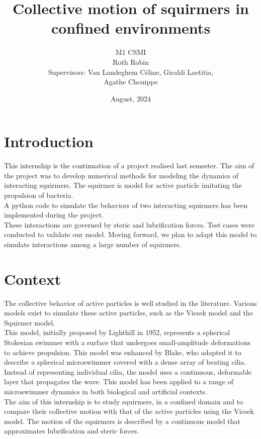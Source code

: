 \documentclass{article}
\begin{document}
\title{Collective motion of squirmers in confined environments\vspace{2cm}}
\author{
M1 CSMI\\
\vspace{3cm}
Roth Robin\\
Supervisors: Van Landeghem Céline, Giraldi Laetitia,\\ Agathe Chouippe
\vspace{2cm}}
\date{August, 2024}
\maketitle

\newpage
\tableofcontents
\newpage
\section{Introduction}
This internship is the continuation of a project realised last semester. The aim of the project was
to develop numerical methods for modeling the dynamics of interacting squirmers. The squirmer is model for active particle imitating the propulsion of bacteria.\\
A python code to simulate the behaviors of two interacting squirmers has been implemented during the project.\\
These interactions are governed by steric and lubrification forces.
Test cases were conducted to validate our model. Moving forward, we plan to adapt this model to 
simulate interactions among a large number of squirmers.
\section{Context}
The collective behavior of active particles is well studied in the literature. 
Various models exist to simulate these active particles, such as the Vicsek model\cite{Vicsek} and the Squirmer model. \\
This model, initially proposed by Lighthill in 1952\cite{Wikipedia}, represents a spherical Stokesian swimmer with a surface that undergoes 
small-amplitude deformations to achieve propulsion. This model was enhanced by Blake\cite{Wikipedia}, who adapted it to describe a spherical microswimmer
 covered with a dense array of beating cilia. Instead of representing individual cilia, the model uses a continuous, deformable layer 
 that propagates the wave.
This model has been applied to a range of microswimmer dynamics in both biological and artificial contexts.\\
The aim of this internship is to study squirmers, 
in a confined domain and to compare their collective motion with that of the active particles using the Vicsek model. 
The motion of the squirmers is described by a continuous model that approximates lubrification and 
steric forces\cite{Brumley}\cite{Lauga}.
\end{document}
